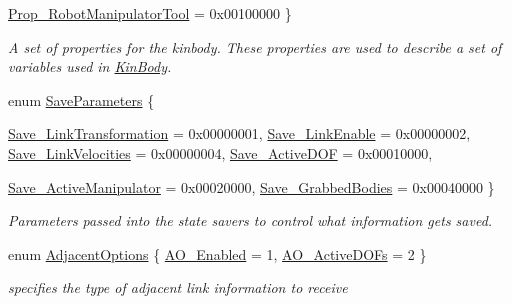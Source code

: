 \begin{DoxyCompactItemize}
\hyperlink{classOpenRAVE_1_1KinBody_a973dd96959f97246c92245c42bce238fa2792bbad36399a273b763b4539fdd497}{Prop\_\-RobotManipulatorTool} =  0x00100000
 \}
\begin{DoxyCompactList}\small\item\em A set of properties for the kinbody. These properties are used to describe a set of variables used in \hyperlink{classOpenRAVE_1_1KinBody}{KinBody}. \item\end{DoxyCompactList}\item 
enum \hyperlink{classOpenRAVE_1_1KinBody_ac26237c033a41ea5d14733a01e1dd388}{SaveParameters} \{ \par
\hyperlink{classOpenRAVE_1_1KinBody_ac26237c033a41ea5d14733a01e1dd388ab33f258d52d1a0adc2f8b75878e3ace2}{Save\_\-LinkTransformation} = 0x00000001, 
\hyperlink{classOpenRAVE_1_1KinBody_ac26237c033a41ea5d14733a01e1dd388a48bd135704be05e76e3a30e2d80209b7}{Save\_\-LinkEnable} = 0x00000002, 
\hyperlink{classOpenRAVE_1_1KinBody_ac26237c033a41ea5d14733a01e1dd388ac7cea6ccd82414804a32fef90681985e}{Save\_\-LinkVelocities} = 0x00000004, 
\hyperlink{classOpenRAVE_1_1KinBody_ac26237c033a41ea5d14733a01e1dd388a9e85e6d610af529b7587518caccccf4a}{Save\_\-ActiveDOF} = 0x00010000, 
\par
\hyperlink{classOpenRAVE_1_1KinBody_ac26237c033a41ea5d14733a01e1dd388abfdea67aabc497c0ecd461a332cf17e1}{Save\_\-ActiveManipulator} = 0x00020000, 
\hyperlink{classOpenRAVE_1_1KinBody_ac26237c033a41ea5d14733a01e1dd388aa8b99f22784feffbd182ad71f8eb8a6f}{Save\_\-GrabbedBodies} = 0x00040000
 \}
\begin{DoxyCompactList}\small\item\em Parameters passed into the state savers to control what information gets saved. \item\end{DoxyCompactList}\item 
enum \hyperlink{classOpenRAVE_1_1KinBody_ace43b2d7d920eeb2eb69299a4784b040}{AdjacentOptions} \{ \hyperlink{classOpenRAVE_1_1KinBody_ace43b2d7d920eeb2eb69299a4784b040a9d927f87563a4c4eb69c2391905bc015}{AO\_\-Enabled} =  1, 
\hyperlink{classOpenRAVE_1_1KinBody_ace43b2d7d920eeb2eb69299a4784b040a471e53775c7eb63178de3a28ed33d64f}{AO\_\-ActiveDOFs} =  2
 \}
\begin{DoxyCompactList}\small\item\em specifies the type of adjacent link information to receive \item\end{DoxyCompactList}\end{DoxyCompactItemize}
